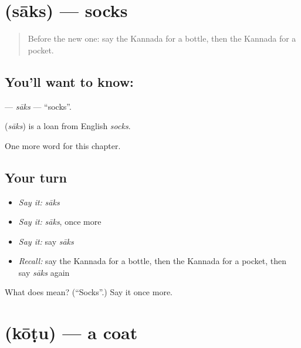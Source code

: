 \section[\texorpdfstring{\kn{ಸಾಕ್ಸ್} (sāks)}{ಸಾಕ್ಸ್ (sāks)}]{ (sāks) — socks}

\label{lesson:KA-C138-saks}



\begin{quote}
Before the new one: say the Kannada for a bottle, then the Kannada for a pocket.
\end{quote}

\subsection*{You'll want to know: }
\textbf{} — \emph{sāks} — \textquotedblleft{}socks\textquotedblright{}.

\begin{cousinweb}
\textbf{} (\emph{sāks}) is a loan from English \emph{socks}.
\end{cousinweb}

\begin{grammarlens}[title={What you've built}]
One more word for this chapter.
\end{grammarlens}

\subsection*{Your turn}
\begin{itemize}
\raggedright
  \item \emph{Say it:} \emph{sāks}
  \item \emph{Say it:} \emph{sāks}, once more
  \item \emph{Say it:} say \emph{sāks}
  \item \emph{Recall:} say the Kannada for a bottle, then the Kannada for a pocket, then say \emph{sāks} again
\end{itemize}

\begin{tcolorbox}[breakable,colback=teal!4,colframe=teal!35!black,title={Before you move on}]
What does  mean? (\textquotedblleft{}Socks\textquotedblright{}.) Say it once more.
\end{tcolorbox}
\section[\texorpdfstring{\kn{ಕೋಟು} (kōṭu)}{ಕೋಟು (kōṭu)}]{ (kōṭu) — a coat}

